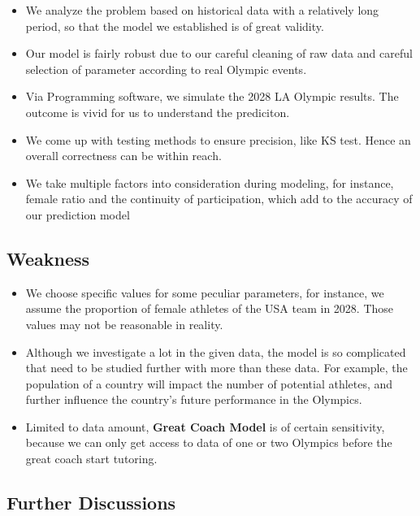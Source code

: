 \begin{itemize}
\item We analyze the problem based on historical data with a relatively long period, so that the model we established is of great validity.

\item Our model is fairly robust due to our careful cleaning of raw data and careful selection of parameter according to real Olympic events.

\item Via Programming software, we simulate the 2028 LA Olympic results. The outcome is vivid for us to understand the prediciton.

\item We come up with testing methods to ensure precision, like KS test. Hence an overall correctness can be within reach.

\item We take multiple factors into consideration during modeling, for instance, female ratio and the continuity of participation, which add to the accuracy of our prediction model
\end{itemize}

\subsection{Weakness}

\begin{itemize}
\item We choose specific values for some peculiar parameters, for instance, we assume the proportion of female athletes of the USA team in 2028. Those values may not be reasonable in reality.

\item Although we investigate a lot in the given data, the model is so complicated that need to be studied further with more than these data. For example, the population
of a country will impact the number of potential athletes, and further influence the country's future performance in the Olympics.

\item Limited to data amount, \textbf{Great Coach Model} is of certain sensitivity, because we can only get access to data of one or two Olympics before the great coach start tutoring.
\end{itemize}

\subsection{Further Discussions}
